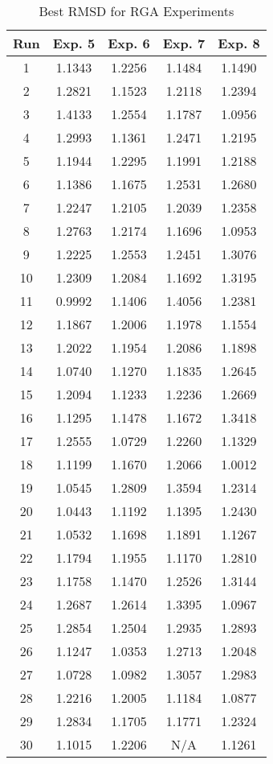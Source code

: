 \begin{table}
	\centering
	\begin{tabular}{ | c | c | c | c | c | }
		\hline
		Run & Exp. 5 & Exp. 6 & Exp. 7 & Exp. 8 \\ \hline
		1 & 1.1343 & 1.2256 & 1.1484 & 1.1490 \\ \hline
		2 & 1.2821 & 1.1523 & 1.2118 & 1.2394 \\ \hline
		3 & 1.4133 & 1.2554 & 1.1787 & 1.0956 \\ \hline
		4 & 1.2993 & 1.1361 & 1.2471 & 1.2195 \\ \hline
		5 & 1.1944 & 1.2295 & 1.1991 & 1.2188 \\ \hline
		6 & 1.1386 & 1.1675 & 1.2531 & 1.2680 \\ \hline
		7 & 1.2247 & 1.2105 & 1.2039 & 1.2358 \\ \hline
		8 & 1.2763 & 1.2174 & 1.1696 & 1.0953 \\ \hline
		9 & 1.2225 & 1.2553 & 1.2451 & 1.3076 \\ \hline
		10 & 1.2309 & 1.2084 & 1.1692 & 1.3195 \\ \hline
		11 & 0.9992 & 1.1406 & 1.4056 & 1.2381 \\ \hline
		12 & 1.1867 & 1.2006 & 1.1978 & 1.1554 \\ \hline
		13 & 1.2022 & 1.1954 & 1.2086 & 1.1898 \\ \hline
		14 & 1.0740 & 1.1270 & 1.1835 & 1.2645 \\ \hline
		15 & 1.2094 & 1.1233 & 1.2236 & 1.2669 \\ \hline
		16 & 1.1295 & 1.1478 & 1.1672 & 1.3418 \\ \hline
		17 & 1.2555 & 1.0729 & 1.2260 & 1.1329 \\ \hline
		18 & 1.1199 & 1.1670 & 1.2066 & 1.0012 \\ \hline
		19 & 1.0545 & 1.2809 & 1.3594 & 1.2314 \\ \hline
		20 & 1.0443 & 1.1192 & 1.1395 & 1.2430 \\ \hline
		21 & 1.0532 & 1.1698 & 1.1891 & 1.1267 \\ \hline
		22 & 1.1794 & 1.1955 & 1.1170 & 1.2810 \\ \hline
		23 & 1.1758 & 1.1470 & 1.2526 & 1.3144 \\ \hline
		24 & 1.2687 & 1.2614 & 1.3395 & 1.0967 \\ \hline
		25 & 1.2854 & 1.2504 & 1.2935 & 1.2893 \\ \hline
		26 & 1.1247 & 1.0353 & 1.2713 & 1.2048 \\ \hline
		27 & 1.0728 & 1.0982 & 1.3057 & 1.2983 \\ \hline
		28 & 1.2216 & 1.2005 & 1.1184 & 1.0877 \\ \hline
		29 & 1.2834 & 1.1705 & 1.1771 & 1.2324 \\ \hline
		30 & 1.1015 & 1.2206 & N/A & 1.1261 \\ \hline
	\end{tabular}
	\caption{Best RMSD for RGA Experiments}
	\label{table:appendix-rga-2}
\end{table}

